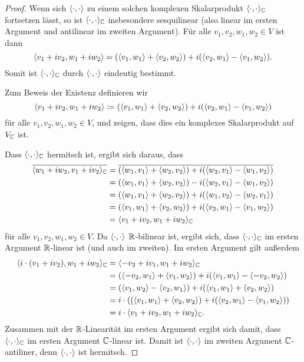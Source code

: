 \documentclass[a4paper,10pt,numbers=noenddot]{scrartcl}
\begin{document}
\begin{proof}
  Wenn sich $\langle \cdot, \cdot \rangle$ zu einem solchen komplexen Skalarprodukt $\langle \cdot, \cdot \rangle_{\mathbb{C}}$ fortsetzen lässt, so ist $\langle \cdot, \cdot \rangle_{\mathbb{C}}$ insbesondere sesquilinear (also linear im ersten Argument und antilinear im zweiten Argument).
  Für alle $v_1, v_2, w_1, w_2 \in V$ ist dann
  \[
      \langle v_1 + i v_2, w_1 + i w_2 \rangle
    = ( \langle v_1, w_1 \rangle + \langle v_2, w_2 \rangle ) + i( \langle v_2, w_1 \rangle - \langle v_1, w_2 \rangle ).
  \]
  Somit ist $\langle \cdot, \cdot \rangle_{\mathbb{C}}$ durch $\langle \cdot, \cdot \rangle$ eindeutig bestimmt.
  
  Zum Beweis der Existenz definieren wir
  \[
              \langle v_1 + iv_2, w_1 + iw_2 \rangle
    \coloneqq ( \langle v_1, w_1 \rangle + \langle v_2, w_2 \rangle ) + i(\langle v_2, w_1 \rangle - \langle v_1, w_2 \rangle )
  \]
  für alle $v_1, v_2, w_1, w_2 \in V$, und zeigen, dass dies ein komplexes Skalarprodukt auf $V_{\mathbb{C}}$ ist.
  
  Dass $\langle \cdot, \cdot \rangle_{\mathbb{C}}$ hermitsch ist, ergibt sich daraus, dass
  \begin{align*}
      \overline{ \langle w_1 + i w_2, v_1 + i v_2 \rangle_{\mathbb{C}} }
    &= \overline{ ( \langle w_1, v_1 \rangle + \langle w_2, v_2 \rangle ) + i( \langle w_2, v_1 \rangle - \langle w_1, v_2 \rangle ) } \\
    &= ( \langle w_1, v_1 \rangle + \langle w_2, v_2 \rangle ) - i( \langle w_2, v_1 \rangle - \langle w_1, v_2 \rangle ) \\
    &= ( \langle w_1, v_1 \rangle + \langle w_2, v_2 \rangle ) + i( \langle w_1, v_2 \rangle - \langle w_2, v_1 \rangle ) \\
    &= ( \langle v_1, w_1 \rangle + \langle v_2, w_2 \rangle ) + i( \langle v_2, w_1 \rangle - \langle v_1, w_2 \rangle ) \\
    &= \langle v_1 + i v_2, w_1 + i w_2 \rangle_{\mathbb{C}}
  \end{align*}
  für alle $v_1, v_2, w_1, w_2 \in V$.
  Da $\langle \cdot, \cdot \rangle$ $\mathbb{R}$-bilinear ist, ergibt sich, dass $\langle \cdot, \cdot \rangle_{\mathbb{C}}$ im ersten Argument $\mathbb{R}$-linear ist (und auch im zweiten).
  Im ersten Argument gilt außerdem
  \begin{align*}
      \langle i \cdot (v_1 + i v_2), w_1 + i w_2 \rangle_{\mathbb{C}}
    &= \langle - v_2 + i v_1, w_1 + i w_2 \rangle_{\mathbb{C}}  \\
    &= (\langle - v_2, w_1 \rangle + \langle v_1, w_2 \rangle) + i(\langle v_1, w_1 \rangle - \langle -v_2, w_2 \rangle) \\
    &= (\langle v_1, w_2 \rangle - \langle v_2, w_1 \rangle) + i(\langle v_1, w_1 \rangle + \langle v_2, w_2 \rangle) \\
    &= i \cdot ( (\langle v_1, w_1 \rangle + \langle v_2, w_2 \rangle) + i (\langle v_2, w_1 \rangle - \langle v_1, w_2 \rangle) )  \\
    &= i \cdot \langle v_1 + i v_2, w_1 + i w_2 \rangle_{\mathbb{C}}.
  \end{align*}
  Zusammen mit der $\mathbb{R}$-Linearität im ersten Argument ergibt sich damit, dass $\langle \cdot, \cdot \rangle_{\mathbb{C}}$ im ersten Argument $\mathbb{C}$-linear ist.
  Damit ist $\langle \cdot, \cdot \rangle$ im zweiten Argument $\mathbb{C}$-antiliner, denn $\langle \cdot, \cdot \rangle$ ist hermitsch.
  

\end{proof}
\end{document}
